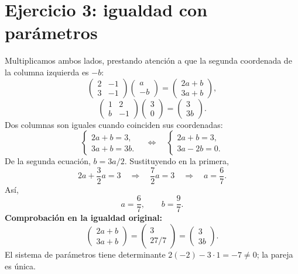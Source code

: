 \documentclass[11pt]{article}
\begin{document}
\section*{Ejercicio 3: igualdad con parámetros}
Multiplicamos ambos lados, prestando atención a que la segunda coordenada de la columna izquierda es $-b$:
\[
\begin{pmatrix}2&-1\\3&-1\end{pmatrix}\begin{pmatrix}a\\-b\end{pmatrix}
=\begin{pmatrix}2a+b\\3a+b\end{pmatrix},
\]
\[
\begin{pmatrix}1&2\\b&-1\end{pmatrix}\begin{pmatrix}3\\0\end{pmatrix}
=\begin{pmatrix}3\\3b\end{pmatrix}.
\]
Dos columnas son iguales cuando coinciden sus coordenadas:
\[
\begin{cases}2a+b=3,\\3a+b=3b.\end{cases}
\quad\Longleftrightarrow\quad
\begin{cases}2a+b=3,\\3a-2b=0.\end{cases}
\]
De la segunda ecuación, $b=3a/2$. Sustituyendo en la primera,
\[2a+\frac32a=3\quad\Longrightarrow\quad\frac72a=3\quad\Longrightarrow\quad a=\frac67.\]
Así,
\[\boxed{a=\frac67,\qquad b=\frac97}.\]
\textbf{Comprobación en la igualdad original:}
\[
\begin{pmatrix}2a+b\\3a+b\end{pmatrix}
=\begin{pmatrix}3\\27/7\end{pmatrix}
=\begin{pmatrix}3\\3b\end{pmatrix}.
\]
El sistema de parámetros tiene determinante $2(-2)-3\cdot1=-7\neq0$; la pareja es única.
\end{document}
